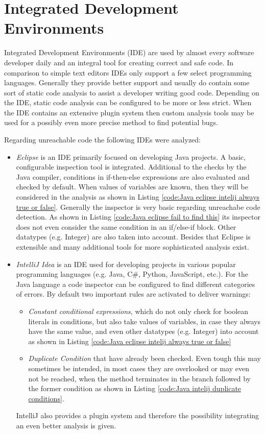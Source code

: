 \section{Integrated Development Environments}
\label{sec:intelliJ}
Integrated Development Environments (IDE) are used by almost every software developer daily and an integral tool for creating correct and safe code.
In comparison to simple text editors IDEs only support a few select programming languages. Generally they provide better support and usually do contain some sort of static code analysis to assist a developer writing good code. 
Depending on the IDE, static code analysis can be configured to be more or less strict. 
When the IDE contains an extensive plugin system then custom analysis tools may be used for a possibly even more precise method to find potential bugs.


Regarding unreachable code the following IDEs were analyzed:
\begin{itemize}
	\item \emph{Eclipse} \cite{incCommunityOpenInnovation} is an IDE primarily focused on developing Java projects. A basic, configurable inspection tool is integrated. Additional to the checks by the Java compiler, conditions in if-then-else expressions are also evaluated and checked by default. When values of variables are known, then they will be considered in the analysis as shown in Listing \ref{code:Java eclipse intelij always true or false}. Generally the inspector is very basic regarding unreachabe code detection. As shown in Listing \ref{code:Java eclipse fail to find this} its inspector does not even consider the same condition in an if/else-if block. Other datatypes (e.g. Integer) are also taken into account. Besides that Eclipse is extensible and many additional tools for more sophisticated analysis exist.
	\item \emph{IntelliJ Idea} \cite{IntelliJIDEACapable} is an IDE used for developing projects in various popular programming languages (e.g. Java, C\#, Python, JavaScript, etc.). For the Java language a code inspector can be configured to find different categories of errors. By default two important rules are activated to deliver warnings: 
	\begin{itemize}
		\item \emph{Constant conditional expressions}, which do not only check for boolean literals in conditions, but also take values of variables, in case they always have the same value, and even other datatypes (e.g. Integer) into account as shown in Listing \ref{code:Java eclipse intelij always true or false}
		\item \emph{Duplicate Condition} that have already been checked. Even tough this may sometimes be intended, in most cases they are overlooked or may even not be reached, when the method terminates in the branch followed by the former condition as shown in Listing \ref{code:Java intelij duplicate conditions}. 
	\end{itemize}
	IntelliJ also provides a plugin system and therefore the possibility integrating an even better analysis is given.
\end{itemize}

